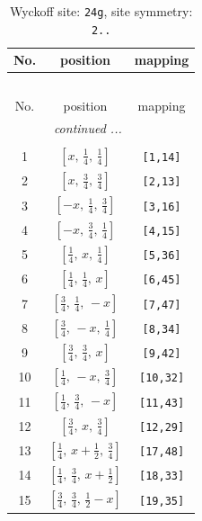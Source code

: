 \documentclass[fleqn,8pt]{jsarticle}
\begin{document}
\begin{longtable}{ccc}
\caption{Wyckoff site: {\tt 24g}, site symmetry: {\tt 2..}}
 \\
 \hline \hline
No. & position & mapping \\ \hline \endfirsthead

\multicolumn{2}{l}{\tablename\ \thetable{}} \\
 \hline \hline
No. & position & mapping \\ \hline \endhead

 \hline \hline
\multicolumn{2}{r}{\footnotesize\it continued ...} \\ \endfoot

 \hline \hline
\multicolumn{2}{r}{} \\ \endlastfoot

1 & $\left[ x,\, \frac{1}{4},\, \frac{1}{4} \right]$ & {\tt [1,14]} \\ \hline
2 & $\left[ x,\, \frac{3}{4},\, \frac{3}{4} \right]$ & {\tt [2,13]} \\ \hline
3 & $\left[ - x,\, \frac{1}{4},\, \frac{3}{4} \right]$ & {\tt [3,16]} \\ \hline
4 & $\left[ - x,\, \frac{3}{4},\, \frac{1}{4} \right]$ & {\tt [4,15]} \\ \hline
5 & $\left[ \frac{1}{4},\, x,\, \frac{1}{4} \right]$ & {\tt [5,36]} \\ \hline
6 & $\left[ \frac{1}{4},\, \frac{1}{4},\, x \right]$ & {\tt [6,45]} \\ \hline
7 & $\left[ \frac{3}{4},\, \frac{1}{4},\, - x \right]$ & {\tt [7,47]} \\ \hline
8 & $\left[ \frac{3}{4},\, - x,\, \frac{1}{4} \right]$ & {\tt [8,34]} \\ \hline
9 & $\left[ \frac{3}{4},\, \frac{3}{4},\, x \right]$ & {\tt [9,42]} \\ \hline
10 & $\left[ \frac{1}{4},\, - x,\, \frac{3}{4} \right]$ & {\tt [10,32]} \\ \hline
11 & $\left[ \frac{1}{4},\, \frac{3}{4},\, - x \right]$ & {\tt [11,43]} \\ \hline
12 & $\left[ \frac{3}{4},\, x,\, \frac{3}{4} \right]$ & {\tt [12,29]} \\ \hline
13 & $\left[ \frac{1}{4},\, x + \frac{1}{2},\, \frac{3}{4} \right]$ & {\tt [17,48]} \\ \hline
14 & $\left[ \frac{1}{4},\, \frac{3}{4},\, x + \frac{1}{2} \right]$ & {\tt [18,33]} \\ \hline
15 & $\left[ \frac{3}{4},\, \frac{3}{4},\, \frac{1}{2} - x \right]$ & {\tt [19,35]} \\ \hline

\end{longtable}
\end{document}
